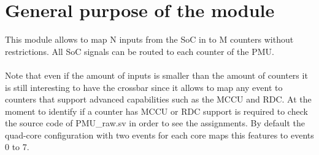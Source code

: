 \newpage
\section{General purpose of the module}

This module allows to map N inputs from the SoC in to M counters without restrictions.
All SoC signals can be routed to each counter of the PMU.\\
\\
Note that even if the amount of inputs is smaller than the amount of counters it is still interesting to have the crossbar since it allows to map any event to counters that support advanced capabilities such as the MCCU and RDC. At the moment to identify if a counter has MCCU or RDC support is required to check the source code of PMU\_raw.sv in order to see the assignments. By default the quad-core configuration with two events for each core maps this features to events 0 to 7.\\
\\


